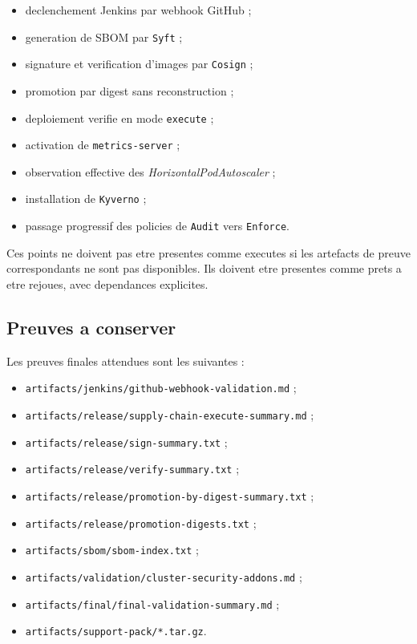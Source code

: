 \begin{itemize}
  \item declenchement Jenkins par webhook GitHub ;
  \item generation de SBOM par \texttt{Syft} ;
  \item signature et verification d'images par \texttt{Cosign} ;
  \item promotion par digest sans reconstruction ;
  \item deploiement verifie en mode \texttt{execute} ;
  \item activation de \texttt{metrics-server} ;
  \item observation effective des \textit{HorizontalPodAutoscaler} ;
  \item installation de \texttt{Kyverno} ;
  \item passage progressif des policies de \texttt{Audit} vers \texttt{Enforce}.
\end{itemize}

Ces points ne doivent pas etre presentes comme executes si les artefacts de
preuve correspondants ne sont pas disponibles. Ils doivent etre presentes comme
prets a etre rejoues, avec dependances explicites.

\subsection{Preuves a conserver}

Les preuves finales attendues sont les suivantes :

\begin{itemize}
  \item \texttt{artifacts/jenkins/github-webhook-validation.md} ;
  \item \texttt{artifacts/release/supply-chain-execute-summary.md} ;
  \item \texttt{artifacts/release/sign-summary.txt} ;
  \item \texttt{artifacts/release/verify-summary.txt} ;
  \item \texttt{artifacts/release/promotion-by-digest-summary.txt} ;
  \item \texttt{artifacts/release/promotion-digests.txt} ;
  \item \texttt{artifacts/sbom/sbom-index.txt} ;
  \item \texttt{artifacts/validation/cluster-security-addons.md} ;
  \item \texttt{artifacts/final/final-validation-summary.md} ;
  \item \texttt{artifacts/support-pack/*.tar.gz}.
\end{itemize}

